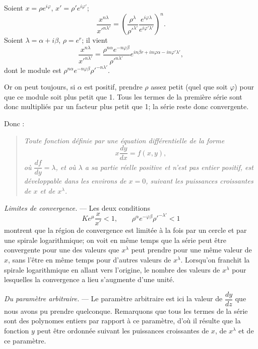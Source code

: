 \documentclass[11pt]{article}
\begin{document}
Soient $x=\rho e^{i\varphi}$, $x'=\rho'e^{i\varphi'}$;
\[
\frac{x^{n\lambda}}{x'^{n\lambda'}}=\left(\frac{\rho^\lambda}{\rho'^{\lambda'}}\frac{e^{i\varphi\lambda}}{e^{i\varphi'\lambda'}}\right)^n.
\]
Soient $\lambda=\alpha+i\beta$, $\rho=e^r$; il vient
\[
\frac{x^{n\lambda}}{x'^{n\lambda'}}=\frac{\rho^{n\alpha}e^{-n\varphi\beta}}{\rho'^{n\lambda'}}e^{in\beta r+in\varphi\alpha-in\varphi'\lambda'},
\]
dont le module est $\rho^{n\alpha}e^{-n\varphi\beta}\rho'^{-n\lambda'}$.

Or on peut toujours, si $\alpha$ est positif, prendre $\rho$ assez petit (quel que soit $\varphi$) pour que ce module soit plus petit que 1. Tous les termes de la première série sont donc multipliés par un facteur plus petit que 1; la série reste donc convergente.

Donc :

\begin{quote}\itshape
Toute fonction définie par une équation différentielle de la forme
\[
x\frac{dy}{dx}=f(x,y),
\]
où $\dfrac{df}{dy}=\lambda$, et où $\lambda$ a sa partie réelle positive et n’est pas entier positif, est développable dans les environs de $x=0$, suivant les puissances croissantes de $x$ et de $x^\lambda$.
\end{quote}

\emph{Limites de convergence.} — Les deux conditions
\[
Ke^\mu\frac{x}{x'}<1,
\qquad
\rho^\alpha e^{-\varphi\beta}\rho'^{-\lambda'}<1
\]
montrent que la région de convergence est limitée à la fois par un cercle et par une spirale logarithmique; on voit en même temps que la série peut être convergente pour une des valeurs que $x^\lambda$ peut prendre pour une même valeur de $x$, sans l’être en même temps pour d’autres valeurs de $x^\lambda$. Lorsqu’on franchit la spirale logarithmique en allant vers l’origine, le nombre des valeurs de $x^\lambda$ pour lesquelles la convergence a lieu s’augmente d’une unité.

\emph{Du paramètre arbitraire.} — Le paramètre arbitraire est ici la valeur de $\dfrac{dy}{dz}$ que nous avons pu prendre quelconque. Remarquons que tous les termes de la série sont des polynomes entiers par rapport à ce paramètre, d’où il résulte que la fonction $y$ peut être ordonnée suivant les puissances croissantes de $x$, de $x^\lambda$ et de ce paramètre.
\end{document}
